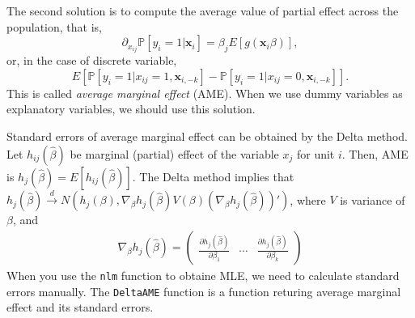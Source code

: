 \documentclass[
  12pt,
]{article}
\begin{document}
The second solution is to compute the average value of partial effect
across the population, that is, \begin{equation*}
  \partial_{x_{ij}} \mathbb{P}[y_i = 1 | \mathbf{x}_i] = \beta_j E[g(\mathbf{x}_i \beta)],
\end{equation*} or, in the case of discrete variable, \begin{equation*}
  E[ \mathbb{P}[y_i = 1 | x_{ij} = 1, \mathbf{x}_{i,-k}] - \mathbb{P}[y_i = 1 | x_{ij} = 0, \mathbf{x}_{i,-k}] ].
\end{equation*} This is called \emph{average marginal effect} (AME).
When we use dummy variables as explanatory variables, we should use this
solution.

Standard errors of average marginal effect can be obtained by the Delta
method. Let \(h_{ij}(\hat{\beta})\) be marginal (partial) effect of the
variable \(x_j\) for unit \(i\). Then, AME is
\(h_j(\hat{\beta}) = E[h_{ij}(\hat{\beta})]\). The Delta method implies
that
\(h_j(\hat{\beta}) \overset{d}{\to} N(h_j(\beta), \nabla_{\beta} h_j(\hat{\beta}) V(\beta) (\nabla_{\beta} h_j(\hat{\beta}))')\),
where \(V\) is variance of \(\beta\), and \begin{align*}
  \nabla_{\beta} h_j(\hat{\beta}) =
  \begin{pmatrix}
    \frac{\partial h_j(\hat{\beta})}{\partial \beta_1} & \cdots & \frac{\partial h_j(\hat{\beta})}{\partial \beta_k}
  \end{pmatrix}
\end{align*} When you use the \texttt{nlm} function to obtaine MLE, we
need to calculate standard errors manually. The \texttt{DeltaAME}
function is a function returing average marginal effect and its standard
errors.
\end{document}
